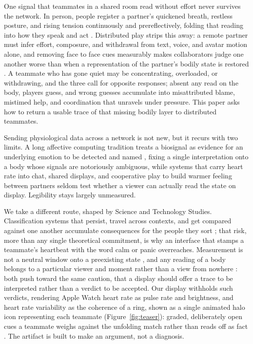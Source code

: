 \documentclass[manuscript,review,anonymous]{acmart}
\begin{document}
One signal that teammates in a shared room read without effort never survives the network. In person, people register a partner's quickened breath, restless posture, and rising tension continuously and prereflectively, folding that reading into how they speak and act \cite{suchman_plans_1987, dourish_where_2004}. Distributed play strips this away: a remote partner must infer effort, composure, and withdrawal from text, voice, and avatar motion alone, and removing face to face cues measurably makes collaborators judge one another worse than when a representation of the partner's bodily state is restored \cite{tan_role_2014}. A teammate who has gone quiet may be concentrating, overloaded, or withdrawing, and the three call for opposite responses; absent any read on the body, players guess, and wrong guesses accumulate into misattributed blame, mistimed help, and coordination that unravels under pressure. This paper asks how to return a usable trace of that missing bodily layer to distributed teammates.

Sending physiological data across a network is not new, but it recurs with two limits. A long affective computing tradition treats a biosignal as evidence for an underlying emotion to be detected and named \cite{picard_affective_1997, mandryk_fuzzy_2007}, fixing a single interpretation onto a body whose signals are notoriously ambiguous, while systems that carry heart rate into chat, shared displays, and cooperative play to build warmer feeling between partners \cite{hassib_heartchat_2017, slovak_understanding_2012, moge_shared_2022, jarvela_augmented_2021, hirsch_my_2023, jiang_intimasea_2023, muller_intra-_2013} seldom test whether a viewer can actually read the state on display. Legibility stays largely unmeasured.

We take a different route, shaped by Science and Technology Studies. Classification systems that persist, travel across contexts, and get compared against one another accumulate consequences for the people they sort \cite{bowker_sorting_2008}; that risk, more than any single theoretical commitment, is why an interface that stamps a teammate's heartbeat with the word calm or panic overreaches. Measurement is not a neutral window onto a preexisting state \cite{barad_meeting_1996}, and any reading of a body belongs to a particular viewer and moment rather than a view from nowhere \cite{haraway_situated_1988}: both push toward the same caution, that a display should offer a trace to be interpreted rather than a verdict to be accepted. Our display withholds such verdicts, rendering Apple Watch heart rate as pulse rate and brightness, and heart rate variability as the coherence of a ring, shown as a single animated halo icon representing each teammate (Figure~\ref{fig:teaser}): graded, deliberately open cues a teammate weighs against the unfolding match rather than reads off as fact \cite{suchman_plans_1987, wakkary_things_2021}. The artifact is built to make an argument, not a diagnosis.
\end{document}
